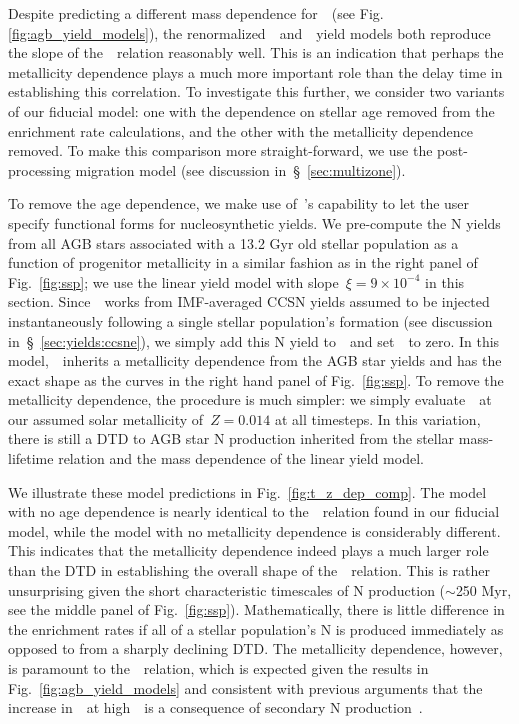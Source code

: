\documentclass[ms.tex]{subfiles}
\begin{document}
Despite predicting a different mass dependence for~~(see Fig.
\ref{fig:agb_yield_models}), the renormalized~\cristallo~and~\ventura~yield
models both reproduce the slope of the~\ohno~relation reasonably well.
This is an indication that perhaps the metallicity dependence plays a much
more important role than the delay time in establishing this correlation.
To investigate this further, we consider two variants of our fiducial model:
one with the dependence on stellar age removed from the enrichment rate
calculations, and the other with the metallicity dependence removed.
To make this comparison more straight-forward, we use the post-processing
migration model (see discussion in~\S~\ref{sec:multizone}).
\par
To remove the age dependence, we make use of~\vice's capability to let the user
specify functional forms for nucleosynthetic yields.
We pre-compute the N yields from all AGB stars associated with a 13.2 Gyr old
stellar population as a function of progenitor metallicity in a similar fashion
as in the right panel of Fig.~\ref{fig:ssp}; we use the linear yield model with
slope~$\xi = 9\times10^{-4}$ in this section.
Since~\vice~works from IMF-averaged CCSN yields assumed to be injected
instantaneously following a single stellar population's formation (see
discussion in~\S~\ref{sec:yields:ccsne}), we simply add this N yield
to~~and set~~to zero.
In this model,~~inherits a metallicity dependence from the AGB star
yields and has the exact shape as the curves in the right hand panel of
Fig.~\ref{fig:ssp}.
To remove the metallicity dependence, the procedure is much simpler: we simply
evaluate~~at our assumed solar metallicity of~$Z = 0.014$ at all
timesteps.
In this variation, there is still a DTD to AGB star N production inherited from
the stellar mass-lifetime relation and the mass dependence of the linear yield
model.
\par
We illustrate these model predictions in Fig.~\ref{fig:t_z_dep_comp}.
The model with no age dependence is nearly identical to the~\ohno~relation
found in our fiducial model, while the model with no metallicity dependence
is considerably different.
This indicates that the metallicity dependence indeed plays a much larger role
than the DTD in establishing the overall shape of the~\ohno~relation.
This is rather unsurprising given the short characteristic timescales of N
production ($\sim$250 Myr, see the middle panel of Fig.~\ref{fig:ssp}).
Mathematically, there is little difference in the enrichment rates if all of a
stellar population's N is produced immediately as opposed to from a sharply
declining DTD.
The metallicity dependence, however, is paramount to the~\ohno~relation, which
is expected given the results in Fig.~\ref{fig:agb_yield_models} and consistent
with previous arguments that the increase in~\no~at high~\oh~is a consequence
of secondary N production~\citep{VilaCostas1993, vanZee1998, Henry1999,
PerezMontero2009, Berg2012, Pilyugin2012, Andrews2013, HaydenPawson2021}.
\end{document}
